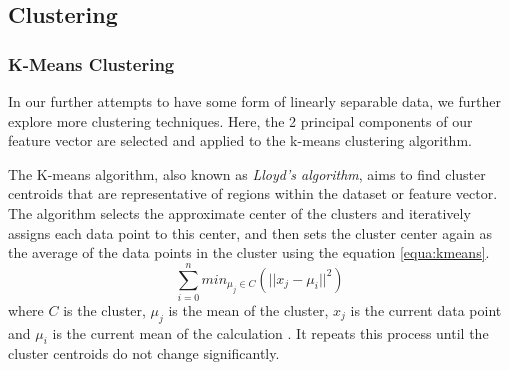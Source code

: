 \documentclass[a4paper,12pt]{report}
\begin{document}
		
		
		
		
		
		
		\subsection{Clustering}
			\subsubsection{K-Means Clustering}
			In our further attempts to have some form of linearly separable data, we further explore more clustering techniques. Here, the 2 principal components of our feature vector are selected and applied to the k-means clustering algorithm.
			
			The K-means algorithm, also known as \textit{Lloyd's algorithm}, aims to find cluster centroids that are representative of regions within the dataset or feature vector. The algorithm selects the approximate center of the clusters and iteratively assigns each data point to this center, and then sets the cluster center again as the average of the data points in the cluster using the equation \ref{equa:kmeans}.
				\begin{equation}
					\label{equa:kmeans}
					\sum_{i=0}^{n}min_{\mu_{j} \in C}(||x_{j} - \mu_{i}||^{2})
				\end{equation}
			where $C$ is the cluster, $\mu_{j}$ is the mean of the cluster, $x_{j}$ is the current data point and $\mu_{i}$ is the current mean of the calculation \cite{Sculley2010}.
			It repeats this process until the cluster centroids do not change significantly.
\end{document}
